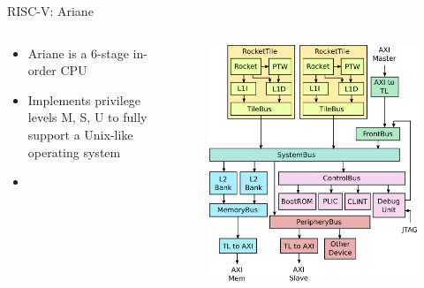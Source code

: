 \begin{frame}{RISC-V: Ariane}
\begin{columns}[T]
  \begin{column}{0.5\textwidth} %

\begin{itemize}
    \item Ariane is a 6-stage in-order CPU
    \item Implements privilege levels M, S, U to fully support a Unix-like operating system
    \item 
\end{itemize}
\end{column}
\begin{column}{.5\textwidth} %

\begin{figure}[!ht]
    \includegraphics[width=1\linewidth]{images/rocketchip-diagram.png}
\end{figure}
\end{column}
\end{columns}
\end{frame}


